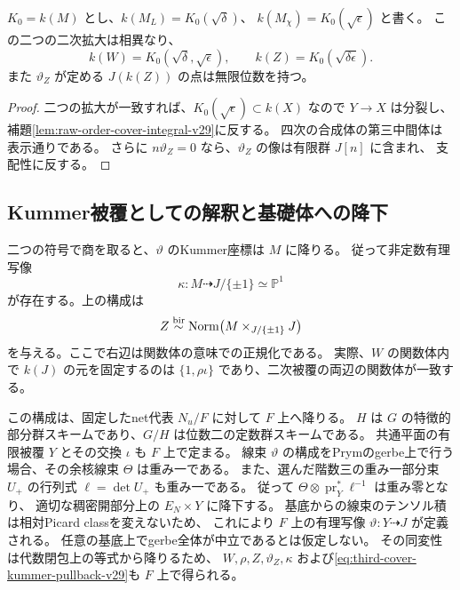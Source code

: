 \begin{corollary}[二つの二次指標の独立性]
\label{cor:quadratic-character-independence-v29}
$K_0=k(M)$ とし、$k(M_L)=K_0(\sqrt\delta)$、
$k(M_\chi)=K_0(\sqrt\epsilon)$ と書く。
この二つの二次拡大は相異なり、
\[
 k(W)=K_0(\sqrt\delta,\sqrt\epsilon),\qquad
 k(Z)=K_0(\sqrt{\delta\epsilon}).
\]
また $\vartheta_Z$ が定める $J(k(Z))$ の点は無限位数を持つ。
\end{corollary}

\begin{proof}
二つの拡大が一致すれば、$K_0(\sqrt\epsilon)\subset k(X)$ なので
$Y\to X$ は分裂し、補題\ref{lem:raw-order-cover-integral-v29}に反する。
四次の合成体の第三中間体は表示通りである。
さらに $n\vartheta_Z=0$ なら、$\vartheta_Z$ の像は有限群 $J[n]$ に含まれ、
支配性に反する。
\end{proof}

\subsection{Kummer被覆としての解釈と基礎体への降下}

二つの符号で商を取ると、$\vartheta$ のKummer座標は $M$ に降りる。
従って非定数有理写像
\[
 \kappa:M\dashrightarrow J/\{\pm1\}\simeq\mathbb P^1
\]
が存在する。上の構成は
\begin{equation}
 Z\mathrel{\overset{\mathrm{bir}}{\sim}} \operatorname{Norm}
 \bigl(M\times_{J/\{\pm1\}}J\bigr)
 \label{eq:third-cover-kummer-pullback-v29}
\end{equation}
を与える。ここで右辺は関数体の意味での正規化である。
実際、$W$ の関数体内で $k(J)$ の元を固定するのは
$\{1,\rho\iota\}$ であり、二次被覆の両辺の関数体が一致する。

この構成は、固定したnet代表 $N_u/F$ に対して $F$ 上へ降りる。
$H$ は $G$ の特徴的部分群スキームであり、$G/H$ は位数二の定数群スキームである。
共通平面の有限被覆 $Y$ とその交換 $\iota$ も $F$ 上で定まる。
線束 $\vartheta$ の構成をPrymのgerbe上で行う場合、その余核線束 $\Theta$ は重み一である。
また、選んだ階数三の重み一部分束 $U_+$ の行列式 $\ell=\det U_+$ も重み一である。
従って $\Theta\otimes\operatorname{pr}_Y^*\ell^{-1}$ は重み零となり、
適切な稠密開部分上の $E_N\times Y$ に降下する。
基底からの線束のテンソル積は相対Picard classを変えないため、
これにより $F$ 上の有理写像 $\vartheta:Y\dashrightarrow J$ が定義される。
任意の基底上でgerbe全体が中立であるとは仮定しない。
その同変性は代数閉包上の等式から降りるため、
$W,\rho,Z,\vartheta_Z,\kappa$ および\eqref{eq:third-cover-kummer-pullback-v29}も
$F$ 上で得られる。

